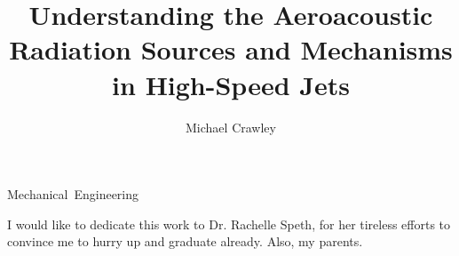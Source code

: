 \documentclass[english,11pt]{osudissert96}
\begin{document}
\author{Michael Crawley}
\title{Understanding the Aeroacoustic Radiation Sources and Mechanisms in High-Speed Jets}
\unit{Mechanical Engineering}


\maketitle
\disscopyright

\begin{abstract}
  
\end{abstract}

\begin{dedications}
I would like to dedicate this work to Dr. Rachelle Speth, for her tireless efforts to convince me to hurry up and graduate already. Also, my parents.	
\end{dedications}



\tableofcontents
\listoffigures
       

  




\clearpage  {} {}\clearpage 


\end{document}
